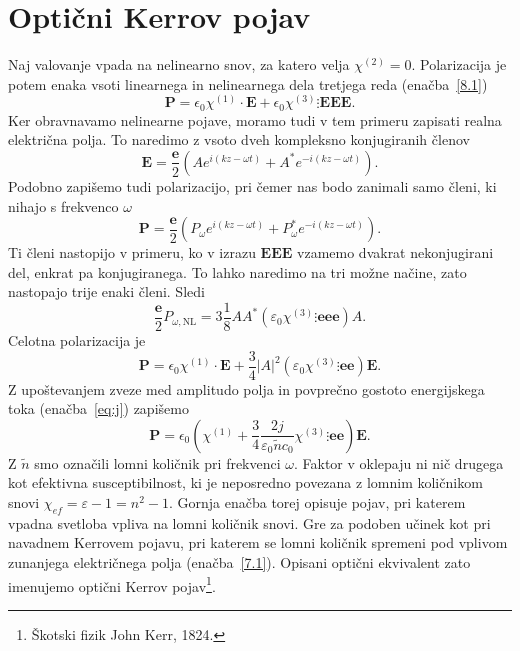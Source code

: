 \section{Optični Kerrov pojav}
\label{OKP}
Naj valovanje vpada na nelinearno snov, za katero velja $\chi^{(2)} = 0$.
Polarizacija je potem enaka vsoti linearnega in nelinearnega dela tretjega reda 
(enačba~\ref{8.1})
\begin{equation}
\mathbf{P}=
\epsilon_{0} \chi^{(1)}\cdot \mathbf{E}+
\epsilon_{0}\chi^{(3)}\vdots \mathbin \mathbf{E}\mathbin \mathbf{E}\mathbin\mathbf{E}.
\end{equation}
Ker obravnavamo nelinearne pojave, moramo tudi v tem primeru zapisati realna
električna polja. To naredimo z vsoto dveh kompleksno konjugiranih členov
\begin{equation}
\mathbf{E}=\frac{\mathbf{e}}{2}(Ae^{i(kz-\omega t)}+A^{*}e^{-i(kz-\omega t)}).
\label{8.71}
\end{equation}
Podobno zapišemo tudi polarizacijo, pri čemer nas bodo zanimali samo členi,
ki nihajo s frekvenco $\omega$
\begin{equation}
\mathbf{P}=\frac{\mathbf{e}}{2}(P_\omega e^{i(kz-\omega t)}+P_\omega^{*}e^{-i(kz-\omega t)}).
\label{8.71a}
\end{equation}
Ti členi nastopijo v primeru, ko
v izrazu $\mathbf{E}\mathbin \mathbf{E}\mathbin\mathbf{E}$ 
vzamemo dvakrat nekonjugirani del, enkrat pa konjugiranega. To lahko naredimo na tri
možne načine, zato nastopajo trije enaki členi. Sledi
\begin{equation}
\frac{\mathbf{e}}{2}P_{\omega,\mathrm{NL}} = 3 \frac{1}{8} A A^* \left( 
\varepsilon_0 \chi^{(3)}\vdots \mathbin \mathbf{e}\mathbin \mathbf{e} \mathbin \mathbf{e} \right) A.
\label{pomega}
\end{equation}
Celotna polarizacija je
\begin{equation}
\mathbf{P}=
\epsilon_{0} \chi^{(1)}\cdot \mathbf{E}+\frac{3}{4} |A|^2 \left( 
\varepsilon_0 \chi^{(3)}\vdots \mathbin \mathbf{e}\mathbin \mathbf{e} \right) \mathbf{E}.
\label{eq:ptnl}
\end{equation}
Z upoštevanjem zveze med amplitudo polja in povprečno gostoto energijskega toka (enačba~\ref{eq:j})
zapišemo
\begin{equation}
\mathbf{P}=
\epsilon_{0} \left( \chi^{(1)} +\frac{3}{4} \frac{2  j }
{\varepsilon_0 \tilde{n} c_0} \chi^{(3)}\vdots \mathbin \mathbf{e}\mathbin 
\mathbf{e} \right) \mathbf{E}.
\end{equation}
Z $\tilde{n}$ smo označili lomni količnik pri frekvenci $\omega$. 
Faktor v oklepaju ni nič drugega kot efektivna susceptibilnost, ki je neposredno povezana
z lomnim količnikom snovi $\chi_{ef} = \varepsilon -1 =n^2 -1$. Gornja enačba torej opisuje pojav, 
pri katerem vpadna svetloba vpliva na lomni količnik snovi.
Gre za podoben učinek kot pri navadnem Kerrovem pojavu, pri katerem se lomni količnik 
spremeni pod vplivom zunanjega električnega polja (enačba~\ref{7.1}).
Opisani optični ekvivalent zato imenujemo optični Kerrov pojav\footnote{Škotski fizik John Kerr, 1824.}. 

